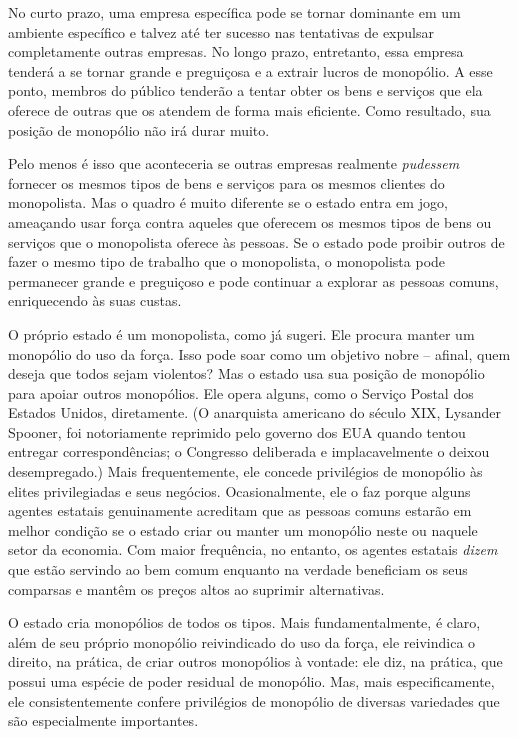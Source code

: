 No curto prazo, uma empresa específica pode se tornar dominante em um ambiente específico e talvez até ter sucesso nas tentativas de expulsar completamente outras empresas. No longo prazo, entretanto, essa empresa tenderá a se tornar grande e preguiçosa e a extrair lucros de monopólio. A esse ponto, membros do público tenderão a tentar obter os bens e serviços que ela oferece de outras que os atendem de forma mais eficiente. Como resultado, sua posição de monopólio não irá durar muito.

Pelo menos é isso que aconteceria se outras empresas realmente \emph{pudessem} fornecer os mesmos tipos de bens e serviços para os mesmos clientes do monopolista. Mas o quadro é muito diferente se o estado entra em jogo, ameaçando usar força contra aqueles que oferecem os mesmos tipos de bens ou serviços que o monopolista oferece às pessoas. Se o estado pode proibir outros de fazer o mesmo tipo de trabalho que o monopolista, o monopolista pode permanecer grande e preguiçoso e pode continuar a explorar as pessoas comuns, enriquecendo às suas custas.

O próprio estado é um monopolista, como já sugeri. Ele procura manter um monopólio do uso da força. Isso pode soar como um objetivo nobre -- afinal, quem deseja que todos sejam violentos? Mas o estado usa sua posição de monopólio para apoiar outros monopólios. Ele opera alguns, como o Serviço Postal dos Estados Unidos, diretamente. (O anarquista americano do século XIX, Lysander Spooner, foi notoriamente reprimido pelo governo dos EUA quando tentou entregar correspondências; o Congresso deliberada e implacavelmente o deixou desempregado.) Mais frequentemente, ele concede privilégios de monopólio às elites privilegiadas e seus negócios. Ocasionalmente, ele o faz porque alguns agentes estatais genuinamente acreditam que as pessoas comuns estarão em melhor condição se o estado criar ou manter um monopólio neste ou naquele setor da economia. Com maior frequência, no entanto, os agentes estatais \emph{dizem} que estão servindo ao bem comum enquanto na verdade beneficiam os seus comparsas e mantêm os preços altos ao suprimir alternativas.

O estado cria monopólios de todos os tipos. Mais fundamentalmente, é claro, além de seu próprio monopólio reivindicado do uso da força, ele reivindica o direito, na prática, de criar outros monopólios à vontade: ele diz, na prática, que possui uma espécie de poder residual de monopólio. Mas, mais especificamente, ele consistentemente confere privilégios de monopólio de diversas variedades que são especialmente importantes.

